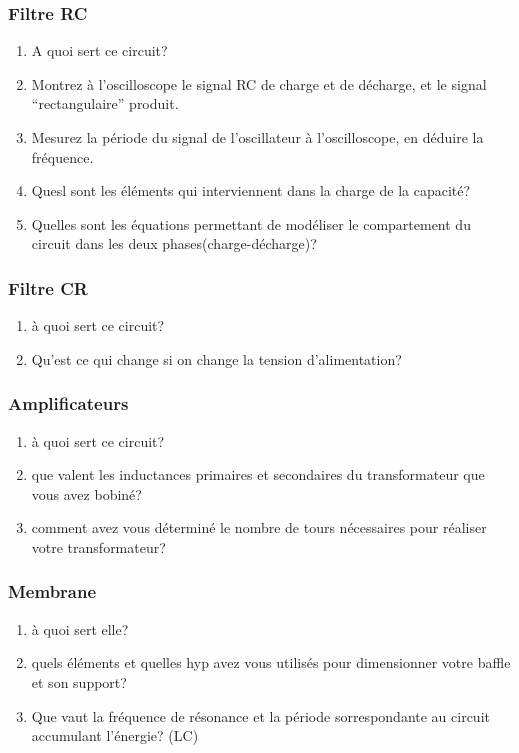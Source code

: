 \subsubsection{Filtre RC}
\begin{enumerate}
\item A quoi sert ce circuit?
\item Montrez à l'oscilloscope le signal RC de charge et de décharge, et le signal "`rectangulaire"' produit.
\item Mesurez la période du signal de l'oscillateur à l'oscilloscope, en déduire la fréquence.
\item Quesl sont les éléments qui interviennent dans la charge de la capacité?
\item Quelles sont les équations permettant de modéliser le compartement du circuit dans les deux phases(charge-décharge)?
\end{enumerate}
\subsubsection{Filtre CR}
\begin{enumerate}
\item à quoi sert ce circuit?
\item Qu'est ce qui change si on change la tension d'alimentation?
\end{enumerate}
\subsubsection{Amplificateurs}
\begin{enumerate}
\item à quoi sert ce circuit?
\item que valent les inductances primaires et secondaires du transformateur que vous avez bobiné?
\item comment avez vous déterminé le nombre de tours nécessaires pour réaliser votre transformateur?
\end{enumerate}
\subsubsection{Membrane}
\begin{enumerate}
\item à quoi sert elle?
\item quels éléments et quelles hyp avez vous utilisés pour dimensionner votre baffle et son support?
\item Que vaut la fréquence de résonance et la période sorrespondante au circuit accumulant l'énergie? (LC)
\end{enumerate}
